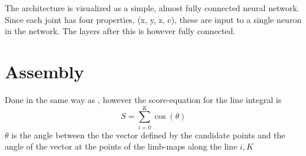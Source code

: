 The architecture is visualized as a simple, almost fully connected neural network. Since each joint has four properties, (x, y, z, c), these are input to a single neuron in the network. The layers after this is however fully connected.

\section{Assembly}

Done in the same way as \cite{cao2019openpose}, however the score-equation for the line integral is
\begin{equation}
  S = \sum_{i=0}^{K}\cos(\theta)
\end{equation}
$\theta$ is the angle between the the vector defined by the candidate points and the angle of the vector at the points of the limb-maps along the line $i, K$


